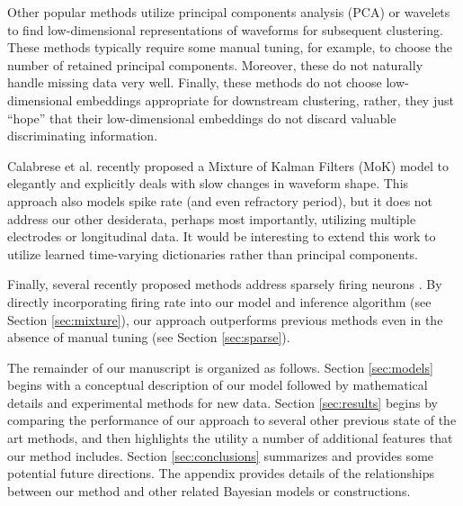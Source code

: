 \documentclass[journal]{IEEEtran}
\begin{document}
Other popular methods utilize principal components analysis (PCA) \cite{Lewicki} or wavelets \cite{Letelier2000} to find low-dimensional representations of waveforms for subsequent clustering.  These methods typically require some manual tuning, for example, to choose the number of retained principal components.  Moreover, these do not naturally handle missing data very well. Finally, these methods do not choose low-dimensional embeddings appropriate for downstream clustering, rather, they just ``hope'' that their low-dimensional embeddings do not discard valuable discriminating information. 


Calabrese et al. \cite{Calabrese2010} recently proposed a Mixture of Kalman Filters (MoK) model to elegantly and explicitly deals with slow changes in waveform shape.  This approach also models spike rate (and even refractory period), but it does not address our other desiderata, perhaps most importantly, utilizing multiple electrodes or longitudinal data. It would be interesting to extend this work to utilize learned time-varying dictionaries rather than principal components.

Finally, several recently proposed methods address sparsely firing neurons \cite{Pedreira2012, Adamos2012}.  By directly incorporating firing rate into our model and inference algorithm (see Section \ref{sec:mixture}), our approach outperforms previous methods even in the absence of manual tuning (see Section \ref{sec:sparse}).

The remainder of our manuscript is organized as follows.  Section \ref{sec:models} begins with a conceptual description of our model followed by mathematical details and experimental methods for new data. Section \ref{sec:results} begins by comparing the performance of our approach to several other previous state of the art methods, and then highlights the utility a number of additional features that our method includes.  Section \ref{sec:conclusions}  summarizes and provides some potential future directions.  The appendix provides details of the relationships between our method and other related Bayesian models or constructions.
\end{document}
